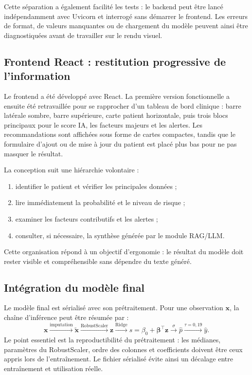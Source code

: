 \documentclass[12pt,a4paper]{report}
\begin{document}
Cette séparation a également facilité les tests : le backend peut être lancé indépendamment
avec Uvicorn et interrogé sans démarrer le frontend. Les erreurs de format, de valeurs
manquantes ou de chargement du modèle peuvent ainsi être diagnostiquées avant de travailler
sur le rendu visuel.

\subsection{Frontend React : restitution progressive de l'information}

Le frontend a été développé avec React. La première version fonctionnelle a ensuite été
retravaillée pour se rapprocher d'un tableau de bord clinique : barre latérale sombre,
barre supérieure, carte patient horizontale, puis trois blocs principaux pour le score IA,
les facteurs majeurs et les alertes. Les recommandations sont affichées sous forme de cartes
compactes, tandis que le formulaire d'ajout ou de mise à jour du patient est placé plus bas
pour ne pas masquer le résultat.

La conception suit une hiérarchie volontaire :
\begin{enumerate}[leftmargin=1.5em]
 \item identifier le patient et vérifier les principales données ;
 \item lire immédiatement la probabilité et le niveau de risque ;
 \item examiner les facteurs contributifs et les alertes ;
 \item consulter, si nécessaire, la synthèse générée par le module RAG/LLM.
\end{enumerate}
Cette organisation répond à un objectif d'ergonomie : le résultat du modèle doit rester
visible et compréhensible sans dépendre du texte généré.

\subsection{Intégration du modèle final}

Le modèle final est sérialisé avec son prétraitement. Pour une observation $\mathbf{x}$, la
chaîne d'inférence peut être résumée par :
\begin{equation}
 \mathbf{x}\xrightarrow{\text{imputation}}\tilde{\mathbf{x}}
 \xrightarrow{\text{RobustScaler}}\mathbf{z}
 \xrightarrow{\text{Ridge}} s=\beta_0+\boldsymbol\beta^\top\mathbf{z}
  \xrightarrow{\sigma}\hat p
  \xrightarrow{\tau=0{,}19}\hat y.
\end{equation}
Le point essentiel est la reproductibilité du prétraitement : les médianes, paramètres du
RobustScaler, ordre des colonnes et coefficients doivent être ceux appris lors de
l'entraînement. Le fichier sérialisé évite ainsi un décalage entre entraînement et
utilisation réelle.
\end{document}
